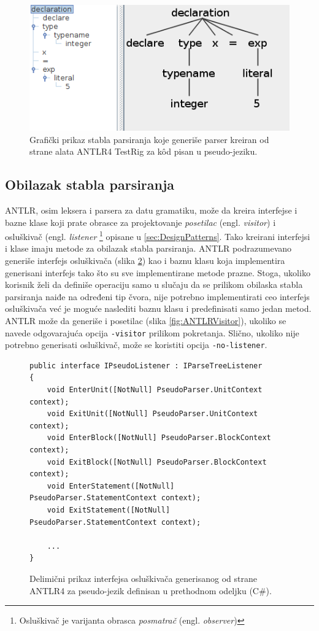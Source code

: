 \begin{figure}[h!]
\centering
\includegraphics[scale=0.8]{images/pseudo_parse_tree.png}
\caption{Grafički prikaz stabla parsiranja koje generiše parser kreiran od strane alata ANTLR4 TestRig za k\^od pisan u pseudo-jeziku.}
\label{fig:PseudoTreeGui}
\end{figure}


\subsection{Obilazak stabla parsiranja}
\label{subsec:ANTLRParserIntegration}

ANTLR, osim leksera i parsera za datu gramatiku, može da kreira interfejse i bazne klase koji prate obrasce za projektovanje \emph{posetilac} (engl. \emph{visitor}) i osluškivač (engl. \emph{listener} \footnote{Osluškivač je varijanta obrasca \emph{posmatrač} (engl. \emph{observer})} opisane u \ref{sec:DesignPatterns}. Tako kreirani interfejsi i klase imaju metode za obilazak stabla parsiranja. ANTLR podrazumevano generiše interfejs osluškivača (slika \ref{fig:ANTLRListener}) kao i baznu klasu koja implementira generisani interfejs tako što su sve implementirane metode prazne. Stoga, ukoliko korisnik želi da definiše operaciju samo u slučaju da se prilikom obilaska stabla parsiranja naiđe na određeni tip čvora, nije potrebno implementirati ceo interfejs osluškivača već je moguće naslediti baznu klasu i predefinisati samo jedan metod. ANTLR može da generiše i posetilac (slika \ref{fig:ANTLRVisitor}), ukoliko se navede odgovarajuća opcija \texttt{-visitor} prilikom pokretanja. Slično, ukoliko nije potrebno generisati osluškivač, može se koristiti opcija \texttt{-no-listener}.

\begin{figure}[h!]
\begin{lstlisting}
public interface IPseudoListener : IParseTreeListener
{
    void EnterUnit([NotNull] PseudoParser.UnitContext context);
    void ExitUnit([NotNull] PseudoParser.UnitContext context);
    void EnterBlock([NotNull] PseudoParser.BlockContext context);
    void ExitBlock([NotNull] PseudoParser.BlockContext context);
    void EnterStatement([NotNull] PseudoParser.StatementContext context);
    void ExitStatement([NotNull] PseudoParser.StatementContext context);
    
    ...
}
\end{lstlisting}
\caption{Delimični prikaz interfejsa osluškivača generisanog od strane ANTLR4 za pseudo-jezik definisan u prethodnom odeljku (C\#).}
\label{fig:ANTLRListener}
\end{figure}

